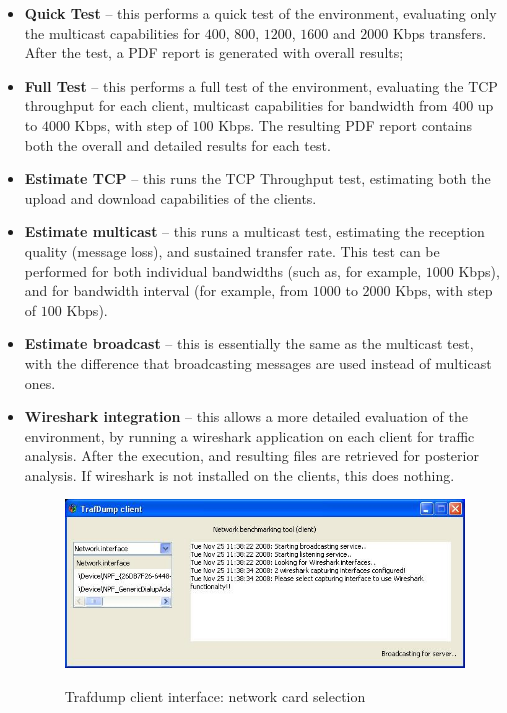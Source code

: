 \documentclass[12pt]{report}
\begin{document}
\begin{itemize}

\item \textbf{Quick Test} -- this performs a quick test of the environment,
evaluating only the multicast capabilities for $400$, $800$, $1200$, $1600$
and $2000$ Kbps transfers. After the test, a PDF report is generated with
overall results;

\item \textbf{Full Test} -- this performs a full test of the environment,
evaluating the TCP throughput for each client, multicast capabilities for
bandwidth from $400$ up to $4000$ Kbps, with step of $100$ Kbps. The
resulting PDF report contains both the overall and detailed results for each
test.

\item \textbf{Estimate TCP} -- this runs the TCP Throughput test, estimating
both the upload and download capabilities of the clients.

\item \textbf{Estimate multicast} -- this runs a multicast test, estimating
the reception quality (message loss), and sustained transfer rate. This test
can be performed for both individual bandwidths (such as, for example,
$1000$ Kbps), and for bandwidth interval (for example, from $1000$ to $2000$
Kbps, with step of $100$ Kbps).

\item \textbf{Estimate broadcast} -- this is essentially the same as the
multicast test, with the difference that broadcasting messages are used
instead of multicast ones.

\item \textbf{Wireshark integration} -- this allows a more detailed
evaluation of the environment, by running a wireshark application on each
client for traffic analysis. After the execution, and resulting files are
retrieved for posterior analysis. If wireshark is not installed on the
clients, this does nothing.

\begin{figure}
\centering
\includegraphics[scale=0.7]{netwin.JPG}
\label{f:netwin}
\caption{Trafdump client interface: network card selection}
\end{figure}


\end{itemize}
\end{document}
